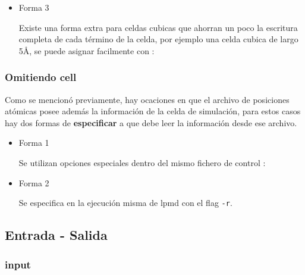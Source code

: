 \begin{itemize}


\item{Forma 3}

Existe una forma extra para celdas cubicas que ahorran un poco la escritura completa de cada t\'ermino de la celda, por ejemplo una celda cubica de largo 5\AA, se puede asignar facilmente con :


\end{itemize}

\subsubsection{Omitiendo cell}
Como se mencion\'o previamente, hay ocaciones en que el archivo de posiciones at\'omicas posee adem\'as la informaci\'on de la celda de simulaci\'on, para estos casos hay dos formas de \textbf{especificar} a {\lpmd} que debe leer la informaci\'on desde ese archivo.

\begin{itemize} 
\item{Forma 1}

Se utilizan opciones especiales dentro del mismo fichero de control :


\item{Forma 2}

Se especifica en la ejecuci\'on misma de lpmd con el flag \verb|-r|.


\end{itemize}

\subsection{Entrada - Salida}

\subsubsection{input}

